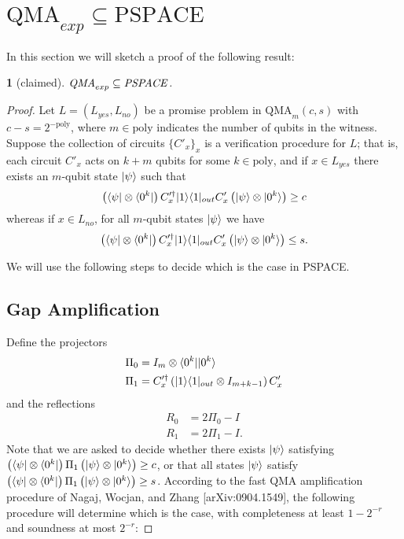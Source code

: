 \documentclass[english]{article}
\numberwithin{equation}{section}
\numberwithin{figure}{section}
\theoremstyle{plain}
\newtheorem{thm}{\protect\theoremname}
\theoremstyle{definition}
\theoremstyle{plain}
\theoremstyle{definition}
\theoremstyle{remark}
\theoremstyle{remark}
\theoremstyle{plain}
\providecommand{\theoremname}{Theorem}
\begin{document}
\section{$\text{QMA}_{exp} \subseteq \text{PSPACE}$}
In this section we will sketch a proof of the following result:
\begin{thm}[claimed]
$\text{\emph{QMA}}_{exp} \subseteq \text{\emph{PSPACE}}$.
\end{thm}
\begin{proof}
Let $L = (L_{yes},L_{no})$ be a promise problem in $\text{QMA}_m(c,s)$ with $c - s = 2^{-\text{poly}}$, where $m \in \text{poly}$ indicates the number of qubits in the witness. Suppose the collection of circuits $\{C'_x\}_x$ is a verification procedure for $L$; that is, each circuit $C'_x$ acts on $k+m$ qubits for some $k \in \text{poly}$, and if $x \in L_{yes}$ there exists an $m$-qubit state $|\psi\rangle$ such that
\begin{equation}
\left(\langle \psi|\otimes \langle 0^k|\right) C'^\dagger_x |1\rangle\langle 1|_{out} C'_x \left(|\psi\rangle\otimes |0^k\rangle\right) \ge c
\end{equation}
whereas if $x \in L_{no}$, for all $m$-qubit states $|\psi\rangle$ we have
\begin{equation}
\left(\langle \psi|\otimes \langle 0^k|\right) C'^\dagger_x |1\rangle\langle 1|_{out} C'_x \left(|\psi\rangle\otimes |0^k\rangle\right) \le s.
\end{equation}

We will use the following steps to decide which is the case in PSPACE.

\subsection{Gap Amplification}

Define the projectors
\begin{align}
\Pi_0 &= I_m \otimes \langle 0^k||0^k\rangle \\
\Pi_1 &= C'^\dagger_x \left(|1\rangle\langle 1|_{out} \otimes I_{m+k-1}\right) C'_x
\end{align}
and the reflections
\begin{align}
R_0 &= 2\Pi_0 - I \\
R_1 &= 2\Pi_1 - I.
\end{align}
Note that we are asked to decide whether there exists $|\psi\rangle$ satisfying $\left(\langle \psi|\otimes \langle 0^k|\right) \Pi_1 \left(|\psi\rangle\otimes |0^k\rangle\right) \ge c$, or that all states $|\psi\rangle$ satisfy $\left(\langle \psi|\otimes \langle 0^k|\right) \Pi_1 \left(|\psi\rangle\otimes |0^k\rangle\right) \ge s$.
According to the fast QMA amplification procedure of Nagaj, Wocjan, and Zhang [arXiv:0904.1549], the following procedure will determine which is the case, with completeness at least $1-2^{-r}$ and soundness at most $2^{-r}$:


\end{proof}
\end{document}
